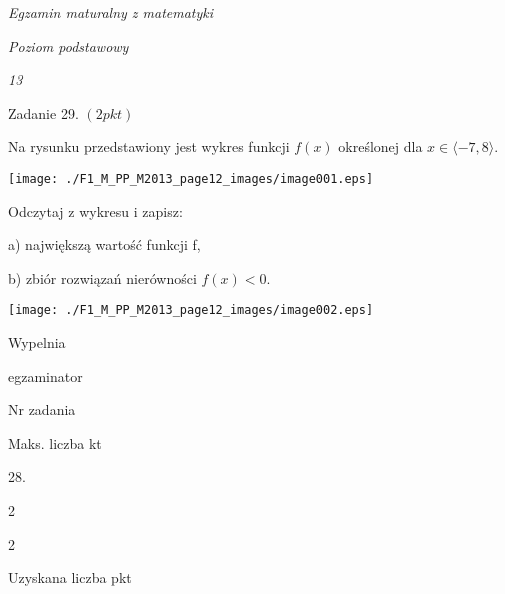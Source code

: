 \documentclass[a4paper,12pt]{article}
\begin{document}
{\it Egzamin maturalny z matematyki}

{\it Poziom podstawowy}

{\it 13}

Zadanie 29. $(2pkt)$

Na rysunku przedstawiony jest wykres funkcji $f(x)$ określonej dla $x\in\langle-7,8\rangle.$
\begin{center}
\texttt{[image: ./F1\_M\_PP\_M2013\_page12\_images/image001.eps]}
\end{center}
Odczytaj z wykresu i zapisz:

a) największą wartość funkcji f,

b) zbiór rozwiązań nierówności $f(x)<0.$
\begin{center}
\texttt{[image: ./F1\_M\_PP\_M2013\_page12\_images/image002.eps]}
\end{center}
Wypelnia

egzaminator

Nr zadania

Maks. liczba kt

28.

2

2

Uzyskana liczba pkt
\end{document}
